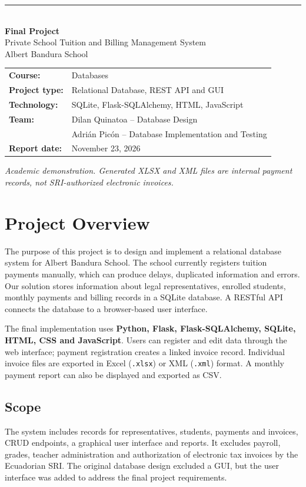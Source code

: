 \documentclass[11pt,letterpaper]{article}
\begin{document}
\begin{titlepage}
\vspace*{1.7cm}
{\color{accent}\rule{2.1cm}{3pt}}\\[0.7cm]
{\Huge\bfseries\color{school} Final Project}\\[0.25cm]
{\Large Private School Tuition and Billing Management System}\\[1cm]
{\large Albert Bandura School}\\[2.1cm]
\begin{tabular}{@{}ll@{}}
\textbf{Course:}& Databases\\
\textbf{Project type:}& Relational Database, REST API and GUI\\
\textbf{Technology:}& SQLite, Flask-SQLAlchemy, HTML, JavaScript\\
\textbf{Team:}& Dilan Quinatoa -- Database Design\\
             & Adri\'an Pic\'on -- Database Implementation and Testing\\
\textbf{Report date:}& November 23, 2026\\
\end{tabular}
\vfill
\small \textit{Academic demonstration. Generated XLSX and XML files are internal payment records, not SRI-authorized electronic invoices.}
\end{titlepage}
\tableofcontents\newpage

\section{Project Overview}
The purpose of this project is to design and implement a relational database system for Albert Bandura School. The school currently registers tuition payments manually, which can produce delays, duplicated information and errors. Our solution stores information about legal representatives, enrolled students, monthly payments and billing records in a SQLite database. A RESTful API connects the database to a browser-based user interface.

The final implementation uses \textbf{Python, Flask, Flask-SQLAlchemy, SQLite, HTML, CSS and JavaScript}. Users can register and edit data through the web interface; payment registration creates a linked invoice record. Individual invoice files are exported in Excel (\texttt{.xlsx}) or XML (\texttt{.xml}) format. A monthly payment report can also be displayed and exported as CSV.

\subsection{Scope}
The system includes records for representatives, students, payments and invoices, CRUD endpoints, a graphical user interface and reports. It excludes payroll, grades, teacher administration and authorization of electronic tax invoices by the Ecuadorian SRI. The original database design excluded a GUI, but the user interface was added to address the final project requirements.
\end{document}
